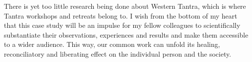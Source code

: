 There is yet too little research being done about Western Tantra, which is where Tantra workshops and retreats belong to. I wish from the bottom of my heart that this case study will be an impulse for my fellow colleagues to scientifically substantiate their observations, experiences and results and make them accessible to a wider audience. This way, our common work can unfold its healing, reconciliatory and liberating effect on the individual person and the society.
